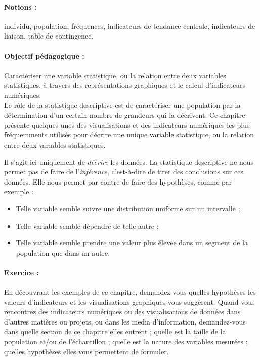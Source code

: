 \label{chap:stat_descr}
\paragraph{Notions :} individu, population, fréquences, indicateurs de tendance
centrale, indicateurs de liaison, table de contingence.

\paragraph{Objectif pédagogique :}
Caractériser une variable statistique, ou la relation entre deux variables
statistiques, à travers des représentations graphiques et le calcul
d'indicateurs numériques.\\

Le rôle de la statistique descriptive est de caractériser une population par la
détermination d'un certain nombre de grandeurs qui la décrivent. Ce chapitre
présente quelques unes des visualisations et des indicateurs numériques les
plus fréquemments utilisés pour décrire une unique variable statistique, ou la
relation entre deux variables statistiques.

Il s'agit ici uniquement de \textit{décrire} les données. La statistique
descriptive ne nous permet pas de faire de l'\textit{inférence}, c'est-à-dire
de tirer des conclusions sur ces données. Elle nous permet par contre de faire
des hypothèses, comme par exemple :
\begin{itemize}
\item Telle variable semble suivre une distribution uniforme sur un intervalle ;
\item Telle variable semble dépendre de telle autre ;
\item Telle variable semble prendre une valeur plus élevée dans un segment de
  la population que dans un autre.
\end{itemize}

\paragraph{Exercice :} En découvrant les exemples de ce chapitre, demandez-vous
quelles hypothèses les valeurs d'indicateurs et les visualisations graphiques
vous suggèrent.  Quand vous rencontrez des indicateurs numériques ou des
visualisations de données dans d'autres matières ou projets, ou dans les media
d'information, demandez-vous dans quelle section de ce chapitre elles entrent ;
quelle est la taille de la population et/ou de l'échantillon ; quelle est la
nature des variables mesurées ; quelles hypothèses elles vous permettent de
formuler.

